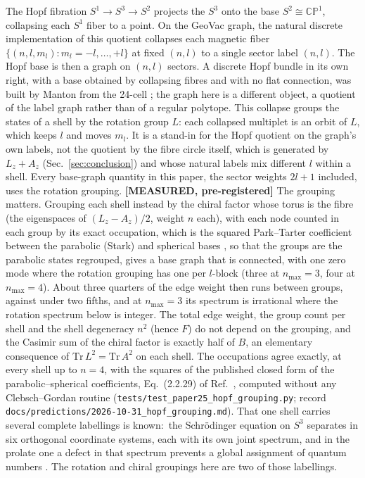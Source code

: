 \documentclass[aps,pra,twocolumn,superscriptaddress,longbibliography]{revtex4-2}
\begin{document}
The Hopf fibration $S^1 \to S^3 \to S^2$ projects the $S^3$ onto the
base $S^2 \cong \mathbb{CP}^1$, collapsing each $S^1$ fiber to a
point.  On the GeoVac graph, the natural discrete implementation of
this quotient collapses each magnetic fiber $\{(n, l, m_l) :
m_l = -l, \ldots, +l\}$ at fixed $(n, l)$ to a single sector label
$(n, l)$.  The Hopf base is then a graph on $(n, l)$ sectors.  A
discrete Hopf bundle in its own right, with a base obtained by
collapsing fibres and with no flat connection, was built by Manton
from the 24-cell \cite{manton1987}; the graph here is a different
object, a quotient of the label graph rather than of a regular
polytope.
This collapse groups the states of a shell by the rotation group $L$:
each collapsed multiplet is an orbit of $L$, which keeps $l$ and moves
$m_l$.  It is a stand-in for the Hopf quotient on the graph's own
labels, not the quotient by the fibre circle itself, which is generated
by $L_z + A_z$ (Sec.~\ref{sec:conclusion}) and whose natural labels mix
different $l$ within a shell.  Every base-graph quantity in this paper,
the sector weights $2l+1$ included, uses the rotation grouping.
\textbf{[MEASURED, pre-registered]} The grouping matters.  Grouping
each shell instead by the chiral factor whose torus is the fibre (the
eigenspaces of $(L_z - A_z)/2$, weight $n$ each), with each node counted
in each group by its exact occupation, which is the squared
Park--Tarter coefficient between the parabolic (Stark) and spherical
bases \cite{park1960,tarter1970}, so that the groups are the parabolic
states regrouped, gives a base graph that is
connected, with one zero mode where the rotation grouping has one per
$l$-block (three at $n_{\max} = 3$, four at $n_{\max} = 4$).  About
three quarters of the edge weight then runs between groups, against
under two fifths, and at $n_{\max} = 3$ its spectrum is irrational where
the rotation spectrum below is integer.  The total edge weight, the
group count per shell and the shell degeneracy $n^2$ (hence $F$) do not
depend on the grouping, and the Casimir sum of the chiral factor is
exactly half of $B$, an elementary consequence of $\mathrm{Tr}\,L^2 =
\mathrm{Tr}\,A^2$ on each shell.  The occupations agree exactly, at
every shell up to $n = 4$, with the squares of the published closed
form of the parabolic--spherical coefficients, Eq.~(2.2.29) of
Ref.~\cite{mardoyan2023}, computed without any Clebsch--Gordan routine
(\texttt{tests/test\_paper25\_hopf\_grouping.py}; record
\texttt{docs/predictions/2026-10-31\_hopf\_grouping.md}).  That one shell
carries several complete labellings is known:\ the Schr\"odinger
equation on $S^3$ separates in six orthogonal coordinate systems, each
with its own joint spectrum, and in the prolate one a defect in that
spectrum prevents a global assignment of quantum numbers
\cite{dawson_dullin2024}.  The rotation and chiral groupings here are two
of those labellings.
\end{document}
